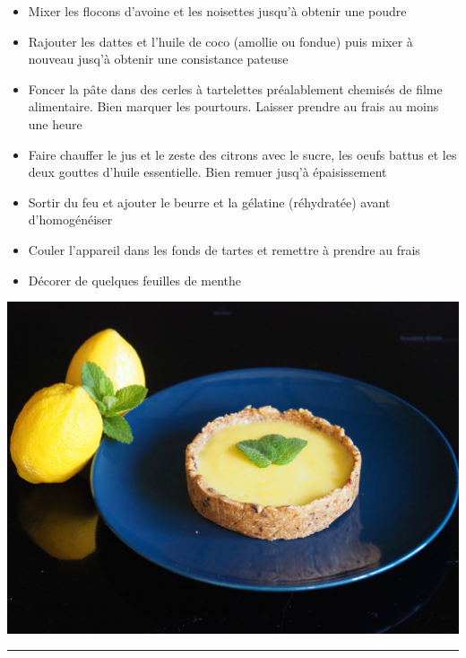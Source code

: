 \documentclass[]{book}
\providecommand{\tightlist}{%
  \setlength{\itemsep}{0pt}\setlength{\parskip}{0pt}}
\begin{document}
\begin{itemize}
\tightlist
\item
  Mixer les flocons d'avoine et les noisettes jusqu'à obtenir une poudre
\item
  Rajouter les dattes et l'huile de coco (amollie ou fondue) puis mixer à nouveau jusq'à obtenir une consistance pateuse
\item
  Foncer la pâte dans des cerles à tartelettes préalablement chemisés de filme alimentaire. Bien marquer les pourtours. Laisser prendre au frais au moins une heure
\item
  Faire chauffer le jus et le zeste des citrons avec le sucre, les oeufs battus et les deux gouttes d'huile essentielle. Bien remuer jusq'à épaisissement
\item
  Sortir du feu et ajouter le beurre et la gélatine (réhydratée) avant d'homogénéiser
\item
  Couler l'appareil dans les fonds de tartes et remettre à prendre au frais
\item
  Décorer de quelques feuilles de menthe
\end{itemize}

\begin{center}\includegraphics[width=0.9\linewidth]{photos/citron_menthe} \end{center}

\begin{center}\rule{0.5\linewidth}{0.5pt}\end{center}
\end{document}
